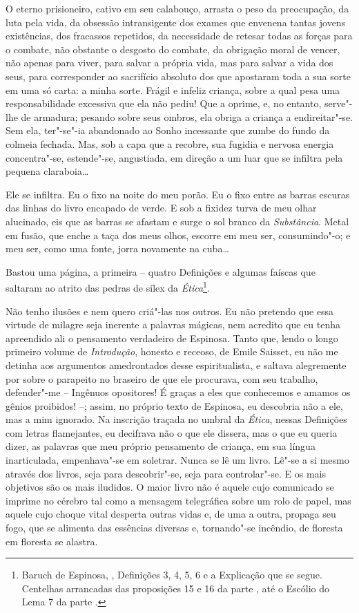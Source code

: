 O eterno prisioneiro, cativo em seu
calabouço, arrasta o peso da preocupação, da luta pela vida, da obsessão
intransigente dos exames que envenena tantas jovens existências, dos
fracassos repetidos, da necessidade de retesar todas as forças para o
combate, não obstante o desgosto do combate, da obrigação moral de
vencer, não apenas para viver, para salvar a própria vida, mas para
salvar a vida dos seus, para corresponder ao sacrifício absoluto dos que
apostaram toda a sua sorte em uma só carta: a minha sorte. Frágil e
infeliz criança, sobre a qual pesa uma responsabilidade excessiva que
ela não pediu! Que a oprime, e, no entanto, serve"-lhe de armadura;
pesando sobre seus ombros, ela obriga a criança a endireitar"-se. Sem
ela, ter"-se"-ia abandonado ao Sonho incessante que zumbe do fundo da
colmeia fechada. Mas, sob a capa que a recobre, sua fugidia e nervosa
energia concentra"-se, estende"-se, angustiada, em direção a um luar que
se infiltra pela pequena claraboia\ldots{}

Ele se infiltra. Eu o fixo na noite do meu porão. Eu o fixo entre as
barras escuras das linhas do livro encapado de verde. E sob a fixidez
turva de meu olhar alucinado, eis que as barras se afastam e surge o sol
branco da \emph{Substância}. Metal em fusão, que enche a taça dos meus
olhos, escorre em meu ser, consumindo"-o; e meu ser, como uma fonte,
jorra novamente na cuba\ldots{}

Bastou uma página, a primeira -- quatro Definições e algumas faíscas que
saltaram ao atrito das pedras de sílex da \emph{Ética}\footnote{Baruch
  de Espinosa, {} \scalebox{0.8}{I}, Definições 3, 4, 5, 6 e a Explicação que
  se segue. Centelhas arrancadas das proposições 15 e 16 da parte \scalebox{0.8}{I}, até
  o Escólio do Lema 7 da parte \scalebox{0.8}{II}.}.

Não tenho ilusões e nem quero criá"-las nos outros. Eu não pretendo que
essa virtude de milagre seja inerente a palavras mágicas, nem acredito
que eu tenha apreendido ali o pensamento verdadeiro de Espinosa. Tanto
que, lendo o longo primeiro volume de \emph{Introdução}, honesto e
receoso, de Emile Saisset, eu não me detinha aos argumentos amedrontados
desse espiritualista, e saltava alegremente por sobre o parapeito no
braseiro de que ele procurava, com seu trabalho, defender"-me -- Ingênuos
opositores! É graças a eles que conhecemos e amamos os gênios proibidos!
--; assim, no próprio texto de Espinosa, eu descobria não a ele, mas a
mim ignorado. Na inscrição traçada no umbral da \emph{Ética}, nessas
Definições com letras flamejantes, eu decifrava não o que ele dissera,
mas o que eu queria dizer, as palavras que meu próprio pensamento de
criança, em sua língua inarticulada, empenhava"-se em soletrar. Nunca se
lê um livro. Lê"-se a si mesmo através dos livros, seja para
descobrir"-se, seja para controlar"-se. E os mais objetivos são os mais
iludidos. O maior livro não é aquele cujo comunicado se imprime no
cérebro tal como a mensagem telegráfica sobre um rolo de papel, mas
aquele cujo choque vital desperta outras vidas e, de uma a outra,
propaga seu fogo, que se alimenta das essências diversas e, tornando"-se
incêndio, de floresta em floresta se alastra.


